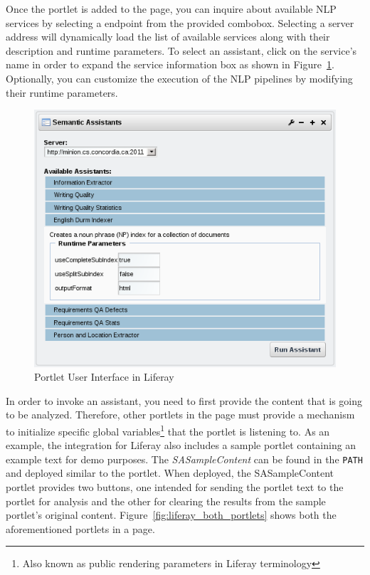 Once the portlet is added to the page, you can inquire about available NLP services by selecting a \sa endpoint from the provided combobox. Selecting a server address will dynamically load the list of available services along with their description and runtime parameters. To select an assistant, click on the service's name in order to expand the service information box as shown in Figure~\ref{fig:liferay_sa_portlet}. Optionally, you can customize the execution of the NLP pipelines by modifying their runtime parameters.

\begin{figure}
\centering
\includegraphics[scale=0.6]{pictures/liferay_sa_portlet.png}
\caption{\sa Portlet User Interface in Liferay}
\label{fig:liferay_sa_portlet}
\end{figure}

\blankline

In order to invoke an assistant, you need to first provide the content that is going to be analyzed. Therefore, other portlets in the page must provide a mechanism to initialize specific global variables\footnote{Also known as public rendering parameters in Liferay terminology} that the \sa portlet is listening to. As an example, the \sa integration for Liferay also includes a sample portlet containing an example text for demo purposes. The \emph{SASampleContent} can be found in the \texttt{PATH} and deployed similar to the \sa portlet. When deployed, the SASampleContent portlet provides two buttons, one intended for sending the portlet text to the \sa portlet for analysis and the other for clearing the results from the sample portlet's original content. Figure~\ref{fig:liferay_both_portlets} shows both the aforementioned portlets in a page.

